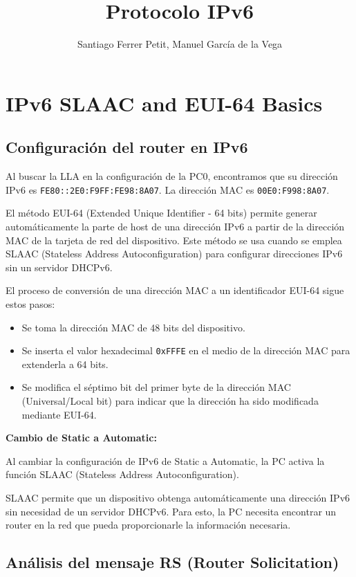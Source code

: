 \documentclass[]{article}
\title{Protocolo IPv6}
\author{Santiago Ferrer Petit, Manuel García de la Vega}
\begin{document}
	
	\maketitle
	
	\section{\textbf{IPv6 SLAAC and EUI-64 Basics}}
	
	\subsection{\textbf{Configuración del router en IPv6}}
	
	Al buscar la LLA en la configuración de la PC0, encontramos que su dirección IPv6 es \texttt{FE80::2E0:F9FF:FE98:8A07}.  
	La dirección MAC es \texttt{00E0:F998:8A07}.
	
	El método EUI-64 (Extended Unique Identifier - 64 bits) permite generar automáticamente la parte de host de una dirección IPv6 a partir de la dirección MAC de la tarjeta de red del dispositivo.  
	Este método se usa cuando se emplea SLAAC (Stateless Address Autoconfiguration) para configurar direcciones IPv6 sin un servidor DHCPv6.
	
	El proceso de conversión de una dirección MAC a un identificador EUI-64 sigue estos pasos:
	
	\begin{itemize}
		\item Se toma la dirección MAC de 48 bits del dispositivo.
		\item Se inserta el valor hexadecimal \texttt{0xFFFE} en el medio de la dirección MAC para extenderla a 64 bits.
		\item Se modifica el séptimo bit del primer byte de la dirección MAC (Universal/Local bit) para indicar que la dirección ha sido modificada mediante EUI-64.
	\end{itemize}
	
	\textbf{Cambio de Static a Automatic:}
	
	Al cambiar la configuración de IPv6 de Static a Automatic, la PC activa la función SLAAC (Stateless Address Autoconfiguration).
	
	SLAAC permite que un dispositivo obtenga automáticamente una dirección IPv6 sin necesidad de un servidor DHCPv6.  
	Para esto, la PC necesita encontrar un router en la red que pueda proporcionarle la información necesaria.
	
	\subsection{\textbf{Análisis del mensaje RS (Router Solicitation)}}
	
\end{document}
